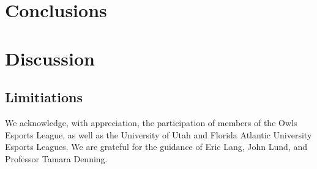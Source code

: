 \documentclass[11pt,manuscript,screen,review]{acmart} %
\begin{document}
\section{Conclusions}

\section{Discussion}

\subsection{Limitiations}

\begin{acks} 
    We acknowledge, with appreciation, the participation of members of the Owls Esports League, as well as the University of Utah and Florida Atlantic University Esports Leagues. We are grateful for the guidance of Eric Lang, John Lund, and Professor Tamara Denning. 
\end{acks}



\end{document}
